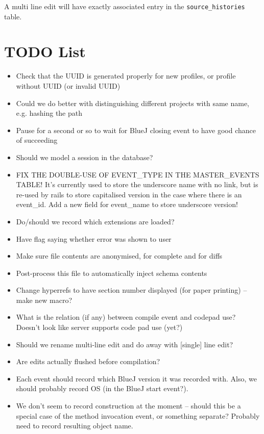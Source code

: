 \documentclass{book}
\begin{document}
A multi line edit will have exactly associated entry in the
\texttt{source\_histories} table.

\chapter{TODO List}

\begin{itemize}
\item Check that the UUID is generated properly for new profiles, or profile without
UUID (or invalid UUID)
\item Could we do better with distinguishing different projects with same
  name, e.g. hashing the path
\item Pause for a second or so to wait for BlueJ closing event to have good
  chance of succeeding
\item Should we model a session in the database?
\item FIX THE DOUBLE-USE OF EVENT\_TYPE IN THE MASTER\_EVENTS TABLE!  It's
  currently used to store the underscore name with no link, but is re-used by
  rails to store capitalised version in the case where there is an event\_id.
  Add a new field for event\_name to store underscore version!
\item Do/should we record which extensions are loaded?
\item Have flag saying whether error was shown to user
\item Make sure file contents are anonymised, for complete and for diffs
\item Post-process this file to automatically inject schema contents
\item Change hyperrefs to have section number displayed (for paper printing)
  -- make new macro?
\item What is the relation (if any) between compile event and codepad use?
  Doesn't look like server supports code pad use (yet?)
\item Should we rename multi-line edit and do away with [single] line edit?
\item Are edits actually flushed before compilation?
\item Each event should record which BlueJ version it was recorded with.
  Also, we should probably record OS (in the BlueJ start event?).
\item We don't seem to record construction at the moment -- should this be a
  special case of the method invocation event, or something separate?
  Probably need to record resulting object name.
\end{itemize}
\end{document}
